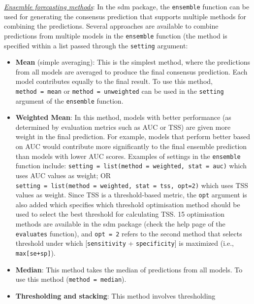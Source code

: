 \documentclass[
]{article}
\begin{document}
\uline{\textit{Ensemble forecasting methods}}: In the sdm package, the
\texttt{ensemble} function can be used for generating the consensus
prediction that supports multiple methods for combining the predictions.
Several approaches are available to combine predictions from multiple
models in the \texttt{ensemble} function (the method is specified within
a list passed through the \texttt{setting} argument:

\begin{itemize}
\item
  \textbf{Mean} (simple averaging): This is the simplest method, where
  the predictions from all models are averaged to produce the final
  consensus prediction. Each model contributes equally to the final
  result. To use this method,
  \texttt{method\ =\ \textquotesingle{}mean\textquotesingle{}} or
  \texttt{method\ =\ \textquotesingle{}unweighted\textquotesingle{}} can
  be used in the \texttt{setting} argument of the \texttt{ensemble}
  function.
\item
  \textbf{Weighted Mean}: In this method, models with better performance
  (as determined by evaluation metrics such as AUC or TSS) are given
  more weight in the final prediction. For example, models that perform
  better based on AUC would contribute more significantly to the final
  ensemble prediction than models with lower AUC scores. Examples of
  settings in the \texttt{ensemble} function include:
  \texttt{setting\ =\ list(method\ =\ \textquotesingle{}weighted\textquotesingle{},\ stat\ =\ \textquotesingle{}auc\textquotesingle{})}
  which uses AUC values as weight; OR
  \texttt{setting\ =\ list(method\ =\ \textquotesingle{}weighted\textquotesingle{},\ stat\ =\ \textquotesingle{}tss\textquotesingle{},\ opt=2)}
  which uses TSS values as weight. Since TSS is a threshold-based
  metric, the \texttt{opt} argument is also added which specifies which
  threshold optimisation method should be used to select the best
  threshold for calculating TSS. 15 optimisation methods are available
  in the sdm package (check the help page of the \texttt{evaluates}
  function), and \texttt{opt\ =\ 2} refers to the second method that
  selects threshold under which {[}\texttt{sensitivity} +
  \texttt{specificity}{]} is maximized (i.e., \texttt{max{[}se+sp{]}}).
\item
  \textbf{Median}: This method takes the median of predictions from all
  models. To use this method
  (\texttt{method\ =\ \textquotesingle{}median\textquotesingle{}}).
\item
  \textbf{Thresholding and stacking}: This method involves thresholding

\end{itemize}
\end{document}

